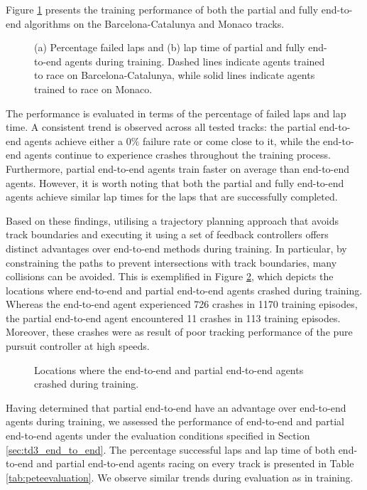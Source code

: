 Figure \ref{fig:all_tracks_train} presents the training performance of both the partial and fully end-to-end algorithms on the Barcelona-Catalunya and Monaco tracks. 
\begin{figure}[htb!]
    \centering
    
    \caption[Learning curves of partial and fully end-to-end agents trained to race on the Porto and Monaco tracks]{(a) Percentage failed laps and (b) lap time of partial and fully end-to-end agents during training. Dashed lines indicate agents trained to race on Barcelona-Catalunya, while solid lines indicate agents trained to race on Monaco.}
    \label{fig:all_tracks_train}
\end{figure}
The performance is evaluated in terms of the percentage of failed laps and lap time.
A consistent trend is observed across all tested tracks: the partial end-to-end agents achieve either a $0\%$ failure rate or come close to it, while the end-to-end agents continue to experience crashes throughout the training process.
Furthermore, partial end-to-end agents train faster on average than end-to-end agents.
However, it is worth noting that both the partial and fully end-to-end agents achieve similar lap times for the laps that are successfully completed. 


Based on these findings, utilising a trajectory planning approach that avoids track boundaries and executing it using a set of feedback controllers offers distinct advantages over end-to-end methods during training.
In particular, by constraining the paths to prevent intersections with track boundaries, many collisions can be avoided. This is exemplified in Figure \ref{fig:esp_crashes}, which depicts the locations where end-to-end and partial end-to-end agents crashed during training.
Whereas the end-to-end agent experienced 726 crashes in 1170 training episodes, the partial end-to-end agent encountered 11 crashes in 113 training episodes.
Moreover, these crashes were as result of poor tracking performance of the pure pursuit controller at high speeds.
\begin{figure}[htb!]
    \centering
    
    \caption{Locations where the end-to-end and partial end-to-end agents crashed during training.}
    \label{fig:esp_crashes}
\end{figure}

Having determined that partial end-to-end have an advantage over end-to-end agents during training, we assessed the performance of end-to-end and partial end-to-end agents under the evaluation conditions specified in Section \ref{sec:td3_end_to_end}.
The percentage successful laps and lap time of both end-to-end and partial end-to-end agents racing on every track is presented in Table \ref{tab:peteevaluation}.
We observe similar trends during evaluation as in training.

